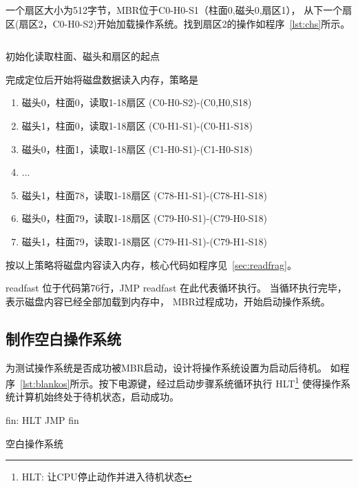 一个扇区大小为512字节，MBR位于C0-H0-S1（柱面0,磁头0,扇区1），\cite{刘伟2010数据恢复技术深度揭秘}
从下一个扇区(扇区2，C0-H0-S2)开始加载操作系统。找到扇区2的操作如程序~\ref{lst:chs}所示。

\begin{listing}[H]
  \begin{codeblock}[.5]
  \inputminted[tabsize=2, firstline=43, lastline=45,
  linenos=true]{nasm}{../ZOS/src/kernel/ipl09.nas}
  \end{codeblock}
  \caption{初始化读取柱面、磁头和扇区的起点}
  \label{sec:chs}
\end{listing}

完成定位后开始将磁盘数据读入内存，策略是
\begin{enumerate}
\item 磁头0，柱面0，读取1-18扇区 (C0-H0-S2)-(C0,H0,S18)
\item 磁头1，柱面0，读取1-18扇区 (C0-H1-S1)-(C0-H1-S18)
\item 磁头0，柱面1，读取1-18扇区 (C1-H0-S1)-(C1-H0-S18)
\item ...
\item 磁头1，柱面78，读取1-18扇区 (C78-H1-S1)-(C78-H1-S18)
\item 磁头0，柱面79，读取1-18扇区 (C79-H0-S1)-(C79-H0-S18)
\item 磁头1，柱面79，读取1-18扇区 (C79-H1-S1)-(C79-H1-S18)
\end{enumerate}

按以上策略将磁盘内容读入内存，核心代码如程序见~\ref{sec:readfrag}。

readfast 位于代码第76行，JMP readfast 在此代表循环执行。
当循环执行完毕，表示磁盘内容已经全部加载到内存中，
MBR过程成功，开始启动操作系统。

\subsection{制作空白操作系统}

为测试操作系统是否成功被MBR启动，设计将操作系统设置为启动后待机。
如程序~\ref{lst:blankos}所示。按下电源键，经过启动步骤系统循环执行
HLT\footnote{HLT: 让CPU停止动作并进入待机状态\cite{30_osKawaiHidemi200630}}
使得操作系统计算机始终处于待机状态，启动成功。

\begin{listing}[H]
  \begin{codeblock}[.5]
    \begin{nasmcode}
      fin:
      HLT
      JMP fin
    \end{nasmcode}
  \end{codeblock}
  \caption{空白操作系统}
  \label{lst:blankos}
\end{listing}

